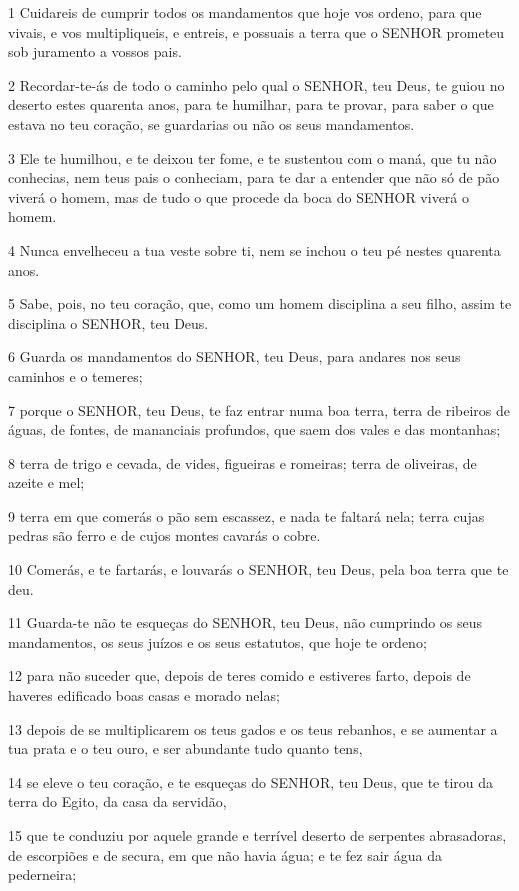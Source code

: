 \par 1 Cuidareis de cumprir todos os mandamentos que hoje vos ordeno, para que vivais, e vos multipliqueis, e entreis, e possuais a terra que o SENHOR prometeu sob juramento a vossos pais.
\par 2 Recordar-te-ás de todo o caminho pelo qual o SENHOR, teu Deus, te guiou no deserto estes quarenta anos, para te humilhar, para te provar, para saber o que estava no teu coração, se guardarias ou não os seus mandamentos.
\par 3 Ele te humilhou, e te deixou ter fome, e te sustentou com o maná, que tu não conhecias, nem teus pais o conheciam, para te dar a entender que não só de pão viverá o homem, mas de tudo o que procede da boca do SENHOR viverá o homem.
\par 4 Nunca envelheceu a tua veste sobre ti, nem se inchou o teu pé nestes quarenta anos.
\par 5 Sabe, pois, no teu coração, que, como um homem disciplina a seu filho, assim te disciplina o SENHOR, teu Deus.
\par 6 Guarda os mandamentos do SENHOR, teu Deus, para andares nos seus caminhos e o temeres;
\par 7 porque o SENHOR, teu Deus, te faz entrar numa boa terra, terra de ribeiros de águas, de fontes, de mananciais profundos, que saem dos vales e das montanhas;
\par 8 terra de trigo e cevada, de vides, figueiras e romeiras; terra de oliveiras, de azeite e mel;
\par 9 terra em que comerás o pão sem escassez, e nada te faltará nela; terra cujas pedras são ferro e de cujos montes cavarás o cobre.
\par 10 Comerás, e te fartarás, e louvarás o SENHOR, teu Deus, pela boa terra que te deu.
\par 11 Guarda-te não te esqueças do SENHOR, teu Deus, não cumprindo os seus mandamentos, os seus juízos e os seus estatutos, que hoje te ordeno;
\par 12 para não suceder que, depois de teres comido e estiveres farto, depois de haveres edificado boas casas e morado nelas;
\par 13 depois de se multiplicarem os teus gados e os teus rebanhos, e se aumentar a tua prata e o teu ouro, e ser abundante tudo quanto tens,
\par 14 se eleve o teu coração, e te esqueças do SENHOR, teu Deus, que te tirou da terra do Egito, da casa da servidão,
\par 15 que te conduziu por aquele grande e terrível deserto de serpentes abrasadoras, de escorpiões e de secura, em que não havia água; e te fez sair água da pederneira;
